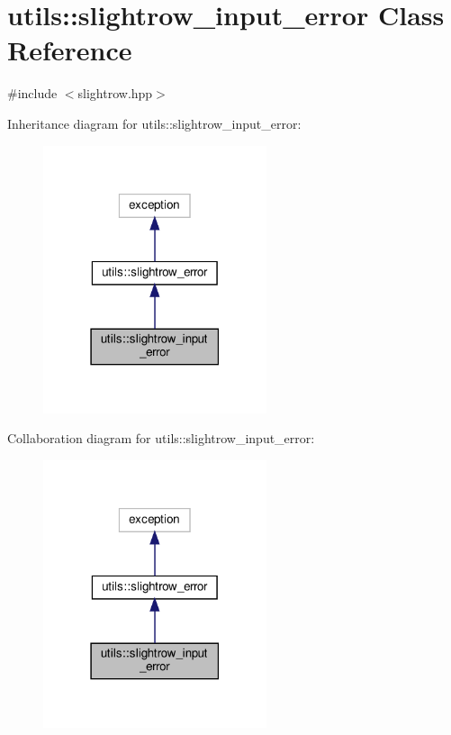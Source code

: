 \hypertarget{classutils_1_1slightrow__input__error}{}\section{utils\+:\+:slightrow\+\_\+input\+\_\+error Class Reference}
\label{classutils_1_1slightrow__input__error}


{\ttfamily \#include $<$slightrow.\+hpp$>$}



Inheritance diagram for utils\+:\+:slightrow\+\_\+input\+\_\+error\+:\nopagebreak
\begin{figure}[H]
\begin{center}
\leavevmode
\includegraphics[width=186pt]{classutils_1_1slightrow__input__error__inherit__graph}
\end{center}
\end{figure}


Collaboration diagram for utils\+:\+:slightrow\+\_\+input\+\_\+error\+:\nopagebreak
\begin{figure}[H]
\begin{center}
\leavevmode
\includegraphics[width=186pt]{classutils_1_1slightrow__input__error__coll__graph}
\end{center}
\end{figure}



